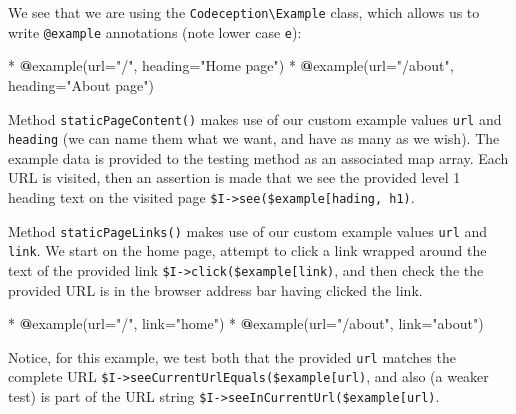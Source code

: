 \documentclass[a4paperpaper,openright]{book}
\newenvironment{Shaded}{}{}
\newcommand{\ErrorTok}[1]{\textcolor[rgb]{1.00,0.00,0.00}{\textbf{#1}}}
\newcommand{\FunctionTok}[1]{\textcolor[rgb]{0.02,0.16,0.49}{#1}}
\newcommand{\NormalTok}[1]{#1}
\newcommand{\OtherTok}[1]{\textcolor[rgb]{0.00,0.44,0.13}{#1}}
\newcommand{\StringTok}[1]{\textcolor[rgb]{0.25,0.44,0.63}{#1}}
\begin{document}
We see that we are using the \texttt{Codeception\textbackslash{}Example}
class, which allows us to write \texttt{@example} annotations (note
lower case \texttt{e}):

\begin{Shaded}
\begin{Highlighting}[]
\NormalTok{    * }\ErrorTok{@}\NormalTok{example}\OtherTok{(}\NormalTok{url=}\StringTok{"/"}\OtherTok{,}\NormalTok{ heading=}\StringTok{"Home page"}\OtherTok{)}
\NormalTok{    * }\ErrorTok{@}\NormalTok{example}\OtherTok{(}\NormalTok{url=}\StringTok{"/about"}\OtherTok{,}\NormalTok{ heading=}\StringTok{"About page"}\OtherTok{)}
\end{Highlighting}
\end{Shaded}

Method \texttt{staticPageContent()} makes use of our custom example
values \texttt{url} and \texttt{heading} (we can name them what we want,
and have as many as we wish). The example data is provided to the
testing method as an associated map array. Each URL is visited, then an
assertion is made that we see the provided level 1 heading text on the
visited page
\texttt{\$I-\textgreater{}see(\$example{[}\textquotesingle{}hading\textquotesingle{}{]},\ \textquotesingle{}h1\textquotesingle{})}.

Method \texttt{staticPageLinks()} makes use of our custom example values
\texttt{url} and \texttt{link}. We start on the home page, attempt to
click a link wrapped around the text of the provided link
\texttt{\$I-\textgreater{}click(\$example{[}\textquotesingle{}link\textquotesingle{}{]})},
and then check the the provided URL is in the browser address bar having
clicked the link.

\begin{Shaded}
\begin{Highlighting}[]
\NormalTok{     * }\ErrorTok{@}\NormalTok{example}\OtherTok{(}\NormalTok{url=}\StringTok{"/"}\OtherTok{,} \FunctionTok{link}\NormalTok{=}\StringTok{"home"}\OtherTok{)}
\NormalTok{     * }\ErrorTok{@}\NormalTok{example}\OtherTok{(}\NormalTok{url=}\StringTok{"/about"}\OtherTok{,} \FunctionTok{link}\NormalTok{=}\StringTok{"about"}\OtherTok{)}
\end{Highlighting}
\end{Shaded}

Notice, for this example, we test both that the provided \texttt{url}
matches the complete URL
\texttt{\$I-\textgreater{}seeCurrentUrlEquals(\$example{[}\textquotesingle{}url\textquotesingle{}{]})},
and also (a weaker test) is part of the URL string
\texttt{\$I-\textgreater{}seeInCurrentUrl(\$example{[}\textquotesingle{}url\textquotesingle{}{]})}.
\end{document}
